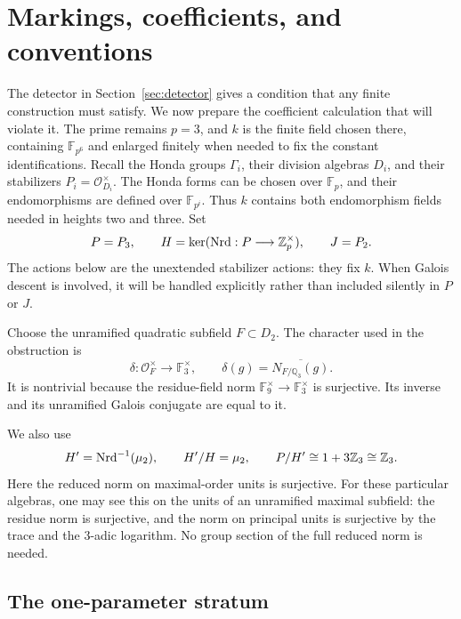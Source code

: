 \section{Markings, coefficients, and conventions}\label{sec:setup}

The detector in Section~\ref{sec:detector} gives a condition that any finite
construction must satisfy. We now prepare the coefficient calculation that
will violate it. The prime remains \(p=3\), and \(k\) is the finite field
chosen there, containing \(\mathbb F_{p^6}\) and enlarged finitely when
needed to fix the constant identifications. Recall the Honda groups
\(\Gamma_i\), their division algebras \(D_i\), and their stabilizers
\(P_i=\mathcal O_{D_i}^{\times}\). The Honda forms can be chosen over
\(\mathbb F_p\), and their endomorphisms are defined over
\(\mathbb F_{p^i}\). Thus \(k\) contains both endomorphism fields needed
in heights two and three. Set
\begin{equation}\label{eq:stabilizers}
 P=P_3,\qquad
 H=\ker(\operatorname{Nrd}:P\longrightarrow\mathbb Z_p^\times),\qquad
 J=P_2.
\end{equation}
The actions below are the unextended stabilizer actions: they fix \(k\).
When Galois descent is involved, it will be handled explicitly rather
than included silently in \(P\) or \(J\).

Choose the unramified quadratic subfield
\(F\subset D_2\). The character used in the obstruction is
\begin{equation}\label{eq:norm-character}
 \delta:\mathcal O_F^\times\longrightarrow\mathbb F_3^\times,
 \qquad
 \delta(g)=\overline{N_{F/\mathbb Q_3}(g)}.
\end{equation}
It is nontrivial because the residue-field norm
\(\mathbb F_9^\times\to\mathbb F_3^\times\) is surjective.
Its inverse and its unramified Galois conjugate are equal to it.

We also use
\[
 H'=\operatorname{Nrd}^{-1}(\mu_2),\qquad
 H'/H=\mu_2,\qquad
 P/H'\cong 1+3\mathbb Z_3\cong\mathbb Z_3.
\]
Here the reduced norm on maximal-order units is surjective. For these
particular algebras, one may see this on the units of an unramified
maximal subfield: the residue norm is surjective, and the norm on
principal units is surjective by the trace and the \(3\)-adic
logarithm. No group section of the full reduced norm is needed.

\subsection{The one-parameter stratum}

